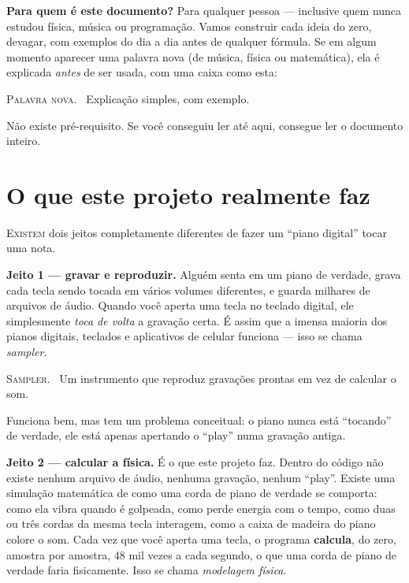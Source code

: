 \documentclass[11pt,oneside]{book}
\newcommand{\nova}[1]{\textsc{\color{accent}#1.}~}
\newcommand{\opening}[2]{\lettrine[lines=2,loversize=0.08,lraise=0.02]{#1}{#2}}
\begin{document}
\noindent\textbf{Para quem é este documento?} Para qualquer pessoa ---
inclusive quem nunca estudou física, música ou programação. Vamos construir
cada ideia do zero, devagar, com exemplos do dia a dia antes de qualquer
fórmula. Se em algum momento aparecer uma palavra nova (de música, física ou
matemática), ela é explicada \emph{antes} de ser usada, com uma caixa como
esta:

\begin{newword}
\nova{Palavra nova} Explicação simples, com exemplo.
\end{newword}

\noindent Não existe pré-requisito. Se você conseguiu ler até aqui, consegue
ler o documento inteiro.

\tableofcontents

\mainmatter
\pagestyle{fancy}

\chapter{O que este projeto realmente faz}

\opening{E}{xistem} dois jeitos completamente diferentes de fazer um
\enquote{piano digital} tocar uma nota.

\textbf{Jeito 1 --- gravar e reproduzir.} Alguém senta em um piano de
verdade, grava cada tecla sendo tocada em vários volumes diferentes, e
guarda milhares de arquivos de áudio. Quando você aperta uma tecla no
teclado digital, ele simplesmente \emph{toca de volta} a gravação certa. É
assim que a imensa maioria dos pianos digitais, teclados e aplicativos de
celular funciona --- isso se chama \emph{sampler}.

\begin{newword}
\nova{Sampler} Um instrumento que reproduz gravações prontas em vez de
calcular o som.
\end{newword}

Funciona bem, mas tem um problema conceitual: o piano nunca está
\enquote{tocando} de verdade, ele está apenas apertando o \enquote{play} numa
gravação antiga.

\textbf{Jeito 2 --- calcular a física.} É o que este projeto faz. Dentro do
código não existe nenhum arquivo de áudio, nenhuma gravação, nenhum
\enquote{play}. Existe uma simulação matemática de como uma corda de piano de
verdade se comporta: como ela vibra quando é golpeada, como perde energia
com o tempo, como duas ou três cordas da mesma tecla interagem, como a caixa
de madeira do piano colore o som. Cada vez que você aperta uma tecla, o
programa \textbf{calcula}, do zero, amostra por amostra, 48 mil vezes a cada
segundo, o que uma corda de piano de verdade faria fisicamente. Isso se
chama \emph{modelagem física}.
\end{document}
